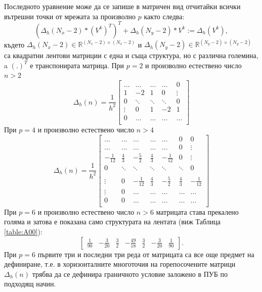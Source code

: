 \documentclass{article}
\newcommand{\be}{\begin{equation}}
\newcommand{\ee}{\end{equation}}
\newcommand{\RR}{\mathbb{R}}
\begin{document}
Последното уравнение може да се запише в матричен вид отчитайки всички вътрешни точки от мрежата за произволно $p$ както следва:
\be\label{DeltaH}
\left( \Delta_{h}(N_x-2)*(V^k)^T\right)^T + \Delta_{h}(N_y-2)*V^k := \Delta_h (V^k) ,
\ee
където $\Delta_{h}(N_x-2) \in \RR^{(N_x-2) \times (N_x-2)}$ и $\Delta_{h}(N_y-2) \in \RR^{(N_y-2) \times (N_y-2)}$ са квадратни лентови матриции с една и съща структура, но с различна големина, a $(.)^T$ е транспонирата матрица. При $p=2$ и произволно естествено число $n>2$ 
\[
\Delta_{h}(n) = \frac{1}{h^2}
\begin{bmatrix}
    \dots       & \dots        &     \dots   &   \dots        & 0   \\
    1               & -2            &   1           &   0               & \vdots    \\
        0           & \ddots        &    \ddots    &   \ddots       &  0 \\ 
    \vdots       &     0            &  1     	& -2    	   & 1 \\
    0               & \dots          &  \dots         & \dots  	   & \dots \\
\end{bmatrix}
\]
При $p=4$ и произволно естествено число $n>4$ 
\[
\Delta_{h}(n) = \frac{1}{h^2}
\begin{bmatrix}
    \dots		& \dots            	& \dots		&   		 \dots  &    \dots      	   &   0           & 0    \\
    \dots    	           &\dots            	& \dots		&   		\dots   &   \dots      	   	   &   0	           & \vdots  \\
    -\frac{1}{12}	& \frac{4}{3}         	& -\frac{5}{2}	&  \frac{4}{3}    	 &   -\frac{1}{12}	  &      0           &\vdots    \\
        0           		& \ddots        	&    \ddots   		 &   \ddots      	 &     \ddots      	  &  \ddots        &    0 \\	
\\
   \vdots      		 & 0           		 &  -\frac{1}{12}	& \frac{4}{3}    	& -\frac{5}{2}	&  \frac{4}{3}  &   -\frac{1}{12} \\
    \vdots    		 & 0        		 &	 \dots     	&  \dots              	&\dots 		 &  \dots 	&\dots   	\\
    0              		 & 0        		 &	 \dots     	&  \dots             	 &\dots 		 &  \dots 	&\dots 	\\
\end{bmatrix}
\]
При $p=6$ и произволно естествено число $n>6$ матрицата става прекалено голяма и затова е показана само структурата на лентата  (виж Таблица \ref{table:A00}):
\[
\begin{bmatrix}
    \frac{1}{90}	& -\frac{3}{20}	& \frac{3}{2}         	& -\frac{49}{18}	&  \frac{3}{2}    	 &   -\frac{3}{20}	  &      \frac{1}{90}
\end{bmatrix}.
\]
При $p=6$ първите три и последни три реда от матрицата са все още предмет на дефиниране, т.е. в хоризонталните многоточия на горепосочените матрици $\Delta_{h}(n)$ трябва да се дефинира граничното условие заложено в ПУБ по подходящ начин.
\end{document}
